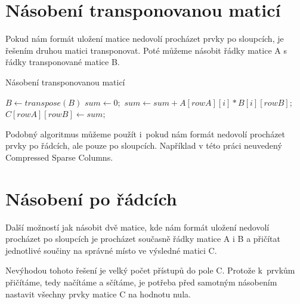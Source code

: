 
\section{Násobení transponovanou maticí}

Pokud nám formát uložení matice nedovolí procházet prvky po sloupcích, je řešením druhou matici transponovat. Poté můžeme násobit řádky matice A s řádky transponované matice B.

\begin{algorithm}[H]
	\caption{Násobení transponovanou maticí}\label{mmm-transpose}
	\begin{algorithmic}[1]
\State \texttt{$B \gets transpose(B)$}
		\State \texttt{$sum \gets 0;$}
			\State \texttt{$sum \gets sum + A[rowA][i] * B[i][rowB];$}
		\EndFor
		\State \texttt{$C[rowA][rowB] \gets sum;$}
	\EndFor
\EndFor
		\EndProcedure
	\end{algorithmic}
\end{algorithm}

Podobný algoritmus můžeme použít i~pokud nám formát nedovolí procházet prvky po řádcích, ale pouze po sloupcích. Například v této práci neuvedený Compressed Sparse Columns.



\section{Násobení po řádcích}

Další možností jak násobit dvě matice, kde nám formát uložení nedovolí procházet po sloupcích je procházet současně řádky matice A i B a přičítat jednotlivé součiny na správné místo ve výsledné matici C.

Nevýhodou tohoto řešení je velký počet přístupů do pole C. Protože k~prvkům přičítáme, tedy načítáme a sčítáme, je potřeba před samotným násobením nastavit všechny prvky matice C na hodnotu nula.


